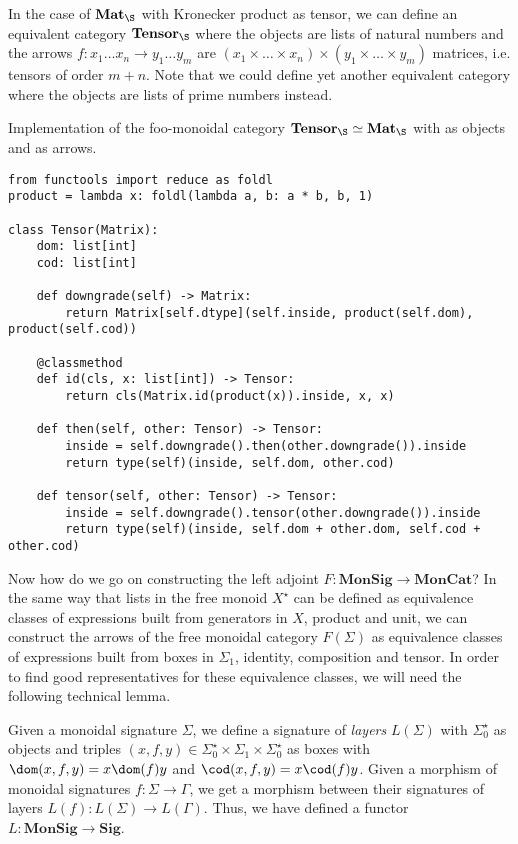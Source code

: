 \begin{example}
In the case of $\mathbf{Mat}_\S$ with Kronecker product as tensor, we can define an equivalent category $\mathbf{Tensor}_\S$ where the objects are lists of natural numbers and the arrows $f : x_1 \dots x_n \to y_1 \dots y_m$ are $(x_1 \times \dots \times x_n) \times (y_1 \times \dots \times y_m)$ matrices, i.e. tensors of order $m + n$.
Note that we could define yet another equivalent category where the objects are lists of prime numbers instead.
\end{example}

\begin{python}
{\normalfont Implementation of the foo-monoidal category $\mathbf{Tensor}_\S \simeq \mathbf{Mat}_\S$ with  as objects and  as arrows.}

\begin{verbatim}
from functools import reduce as foldl
product = lambda x: foldl(lambda a, b: a * b, b, 1)

class Tensor(Matrix):
    dom: list[int]
    cod: list[int]

    def downgrade(self) -> Matrix:
        return Matrix[self.dtype](self.inside, product(self.dom), product(self.cod))

    @classmethod
    def id(cls, x: list[int]) -> Tensor:
        return cls(Matrix.id(product(x)).inside, x, x)

    def then(self, other: Tensor) -> Tensor:
        inside = self.downgrade().then(other.downgrade()).inside
        return type(self)(inside, self.dom, other.cod)

    def tensor(self, other: Tensor) -> Tensor:
        inside = self.downgrade().tensor(other.downgrade()).inside
        return type(self)(inside, self.dom + other.dom, self.cod + other.cod)
\end{verbatim}
\end{python}

Now how do we go on constructing the left adjoint $F : \mathbf{MonSig} \to \mathbf{MonCat}$?
In the same way that lists in the free monoid $X^\star$ can be defined as equivalence classes of expressions built from generators in $X$, product and unit, we can construct the arrows of the free monoidal category $F(\Sigma)$ as equivalence classes of expressions built from boxes in $\Sigma_1$, identity, composition and tensor.
In order to find good representatives for these equivalence classes, we will need the following technical lemma.

\begin{definition}
Given a monoidal signature $\Sigma$, we define a signature of \emph{layers} $L(\Sigma)$ with $\Sigma_0^\star$ as objects and triples $(x, f, y) \in \Sigma_0^\star \times \Sigma_1 \times \Sigma_0^\star$ as boxes with $\dom(x, f, y) = x \dom(f) y$ and $\cod(x, f, y) = x \cod(f) y$.
Given a morphism of monoidal signatures $f : \Sigma \to \Gamma$, we get a morphism between their signatures of layers $L(f) : L(\Sigma) \to L(\Gamma)$.
Thus, we have defined a functor $L : \mathbf{MonSig} \to \mathbf{Sig}$.
\end{definition}

